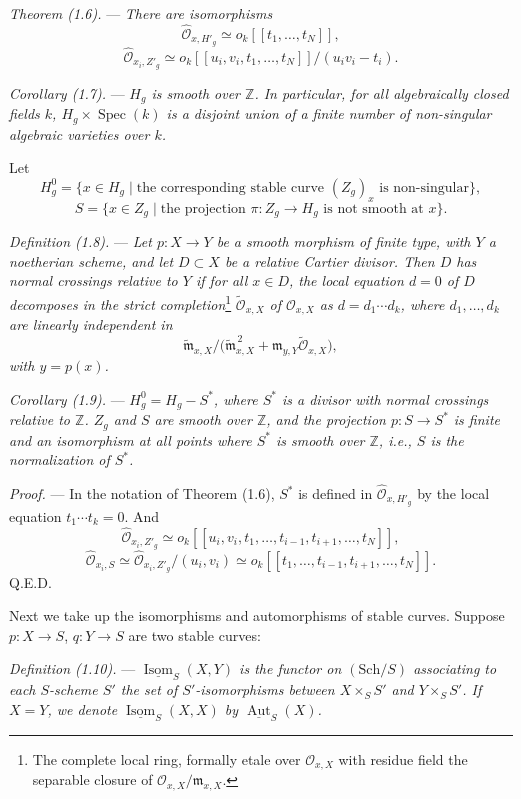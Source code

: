 \documentclass[10pt]{article}
\newcommand{\Spec}{\operatorname{Spec}}
\newcommand{\Aut}{\operatorname{Aut}}
\newcommand{\Isom}{\operatorname{Isom}}
\newcommand{\cO}{\mathcal O}
\newcommand{\QED}{\hfill Q.E.D.}
\begin{document}
\medskip
\noindent\emph{Theorem (1.6).} --- \emph{There are isomorphisms}
\[
\widehat{\cO}_{x,H'_g}\simeq o_k[[t_1,\ldots,t_N]],
\]
\[
\widehat{\cO}_{x_i,Z'_g}\simeq o_k[[u_i,v_i,t_1,\ldots,t_N]]/(u_i v_i-t_i).
\]

\medskip
\noindent\emph{Corollary (1.7).} --- \emph{$H_g$ is smooth over $\mathbb Z$. In particular, for all algebraically closed fields $k$, $H_g\times\Spec(k)$ is a disjoint union of a finite number of non-singular algebraic varieties over $k$.}

Let
\[
H_g^0=\{x\in H_g\mid \text{the corresponding stable curve }(Z_g)_x\text{ is non-singular}\},
\]
\[
S=\{x\in Z_g\mid \text{the projection }\pi:Z_g\to H_g\text{ is not smooth at }x\}.
\]

\medskip
\noindent\emph{Definition (1.8).} --- \emph{Let $p:X\to Y$ be a smooth morphism of finite type, with $Y$ a noetherian scheme, and let $D\subset X$ be a relative Cartier divisor. Then $D$ has normal crossings relative to $Y$ if for all $x\in D$, the local equation $d=0$ of $D$ decomposes in the strict completion}\footnote{The complete local ring, formally etale over $\cO_{x,X}$ with residue field the separable closure of $\cO_{x,X}/\mathfrak m_{x,X}$.}\emph{ $\widetilde{\cO}_{x,X}$ of $\cO_{x,X}$ as $d=d_1\cdots d_k$, where $d_1,\ldots,d_k$ are linearly independent in}
\[
\widetilde{\mathfrak m}_{x,X}/\bigl(\widetilde{\mathfrak m}_{x,X}^{\,2}+\mathfrak m_{y,Y}\widetilde{\cO}_{x,X}\bigr),
\]
\emph{with $y=p(x)$.}

\medskip
\noindent\emph{Corollary (1.9).} --- \emph{$H_g^0=H_g-S^*$, where $S^*$ is a divisor with normal crossings relative to $\mathbb Z$. $Z_g$ and $S$ are smooth over $\mathbb Z$, and the projection $p:S\to S^*$ is finite and an isomorphism at all points where $S^*$ is smooth over $\mathbb Z$, i.e., $S$ is the normalization of $S^*$.}

\noindent\emph{Proof.} --- In the notation of Theorem (1.6), $S^*$ is defined in $\widehat{\cO}_{x,H'_g}$ by the local equation $t_1\cdots t_k=0$. And
\[
\widehat{\cO}_{x_i,Z'_g}\simeq o_k[[u_i,v_i,t_1,\ldots,t_{i-1},t_{i+1},\ldots,t_N]],
\]
\[
\widehat{\cO}_{x_i,S}\simeq \widehat{\cO}_{x_i,Z'_g}/(u_i,v_i)
\simeq o_k[[t_1,\ldots,t_{i-1},t_{i+1},\ldots,t_N]].
\]
\QED


Next we take up the isomorphisms and automorphisms of stable curves. Suppose $p:X\to S$, $q:Y\to S$ are two stable curves:

\medskip
\noindent\emph{Definition (1.10).} --- \emph{$\underline{\Isom}_S(X,Y)$ is the functor on $(\mathrm{Sch}/S)$ associating to each $S$-scheme $S'$ the set of $S'$-isomorphisms between $X\times_S S'$ and $Y\times_S S'$. If $X=Y$, we denote $\underline{\Isom}_S(X,X)$ by $\underline{\Aut}_S(X)$.}
\end{document}
